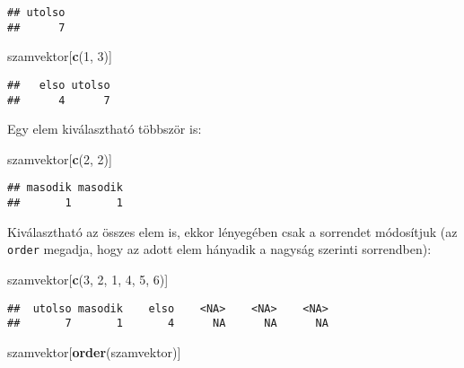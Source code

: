 \documentclass[
]{book}
\newenvironment{Shaded}{\begin{snugshade}}{\end{snugshade}}
\newcommand{\DecValTok}[1]{\textcolor[rgb]{0.00,0.00,0.81}{#1}}
\newcommand{\KeywordTok}[1]{\textcolor[rgb]{0.13,0.29,0.53}{\textbf{#1}}}
\newcommand{\NormalTok}[1]{#1}
\begin{document}
\begin{verbatim}
## utolso 
##      7
\end{verbatim}

\begin{Shaded}
\begin{Highlighting}[]
\NormalTok{szamvektor[}\KeywordTok{c}\NormalTok{(}\DecValTok{1}\NormalTok{, }\DecValTok{3}\NormalTok{)]}
\end{Highlighting}
\end{Shaded}

\begin{verbatim}
##   elso utolso 
##      4      7
\end{verbatim}

Egy elem kiválasztható többször is:

\begin{Shaded}
\begin{Highlighting}[]
\NormalTok{szamvektor[}\KeywordTok{c}\NormalTok{(}\DecValTok{2}\NormalTok{, }\DecValTok{2}\NormalTok{)]}
\end{Highlighting}
\end{Shaded}

\begin{verbatim}
## masodik masodik 
##       1       1
\end{verbatim}

Kiválasztható az összes elem is, ekkor lényegében csak a sorrendet módosítjuk (az \texttt{order} megadja, hogy az adott elem hányadik a nagyság szerinti sorrendben):

\begin{Shaded}
\begin{Highlighting}[]
\NormalTok{szamvektor[}\KeywordTok{c}\NormalTok{(}\DecValTok{3}\NormalTok{, }\DecValTok{2}\NormalTok{, }\DecValTok{1}\NormalTok{, }\DecValTok{4}\NormalTok{, }\DecValTok{5}\NormalTok{, }\DecValTok{6}\NormalTok{)]}
\end{Highlighting}
\end{Shaded}

\begin{verbatim}
##  utolso masodik    elso    <NA>    <NA>    <NA> 
##       7       1       4      NA      NA      NA
\end{verbatim}

\begin{Shaded}
\begin{Highlighting}[]
\NormalTok{szamvektor[}\KeywordTok{order}\NormalTok{(szamvektor)]}
\end{Highlighting}
\end{Shaded}
\end{document}
